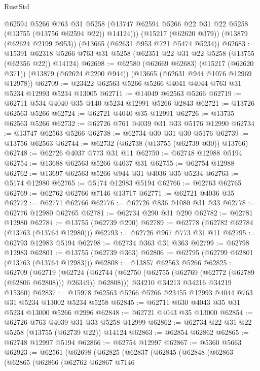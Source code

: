 \begin{lexlean}{RustStd}
\begin{coremodule}
        @62594
        @5266
        @763
        @31
        @5258
        (@13747 @62594 @5266 @22 @31 @22 @5258 (@13755 (@13756 @62594 @22)) @14124)))
    (@15217 (@62620 @379))
    (@13879 (@62624 @2199 @953))
    (@13665 (@62631 @953 @721 @5474 @5234))
@62683 := @15391 @62318 @5266 @763 @31 @5258 (@62351 @22 @31 @22 @5258 (@13755 (@62356 @22)) @14124)
@62698 := @62580
    (@62669 @62683)
    (@15217 (@62620 @371))
    (@13879 (@62624 @2200 @944))
    (@13665 (@62631 @944 @1076 @12969 @12978))
@62709 := @23422 @62563 @5266 @5266 @4041 @4044 @763 @31 @5234 @12993 @5234 @13005
@62711 := @14049 @62563 @5266
@62719 := @62711 @534 @4040 @35 @140 @5234 @12991 @5266 @2843
@62721 := @13726 @62563 @5266
@62724 := @62721 @4040 @35 @12991
@62726 := @13735 @62563 @5266
@62732 := @62726 @761 @4039 @31 @33 @5176 @12990
@62734 := @13747 @62563 @5266
@62738 := @62734 @30 @31 @30 @5176
@62739 := @13756 @62563
@62744 := @62732 (@62738 (@13755 (@62739 @30)) @13766)
@62748 := @62726 @4037 @773 @31 @11
@62750 := @62748 @12988 @5194
@62754 := @13688 @62563 @5266 @4037 @31
@62755 := @62754 @12988
@62762 := @13697 @62563 @5266 @944 @31 @4036 @35 @5234
@62763 := @5174 @12980
@62765 := @5174 @12983 @5194
@62766 := @62763 @62765
@62769 := @62762 @62766 @7146 @13717
@62771 := @62721 @4036 @35
@62772 := @62771 @62766
@62776 := @62726 @836 @1080 @31 @33
@62778 := @62776 @12980 @62765
@62781 := @62734 @290 @31 @290
@62782 := @62781 @12980
@62784 := @13755 (@62739 @290)
@62789 := @62778 (@62782 @62784 (@13763 (@13764 @12980)))
@62793 := @62726 @967 @773 @31 @11
@62795 := @62793 @12983 @5194
@62798 := @62734 @363 @31 @363
@62799 := @62798 @12983
@62801 := @13755 (@62739 @363)
@62806 := @62795 (@62799 @62801 (@13763 (@13764 @12983)))
@62808 := @13857 @62563 @5266
@62825 := @62709
    (@62719
      (@62724 (@62744 (@62750 (@62755 (@62769 (@62772 (@62789 (@62806 @62808))) @26349)) @62808)))
      @34210
      @34213
      @34216
      @34219
      @15360)
@62837 := @15978 @62563 @5266 @5266 @23455 @12993 @4044 @763 @31 @5234 @13002 @5234 @5258
@62845 := @62711 @630 @4043 @35 @31 @5234 @13000 @5266 @2996
@62848 := @62721 @4043 @35 @13000
@62854 := @62726 @763 @4039 @31 @33 @5258 @12999
@62862 := @62734 @22 @31 @22 @5258 (@13755 (@62739 @22)) @14124
@62863 := @62854 @62862
@62865 := @62748 @12997 @5194
@62866 := @62754 @12997
@62867 := @5360 @5663
@62923 := @62561
    (@62698
      (@62825
        (@62837
          (@62845
            (@62848
              (@62863
                (@62865
                  (@62866
                    (@62762
                      @62867
                      @7146

\end{coremodule}
\end{lexlean}
